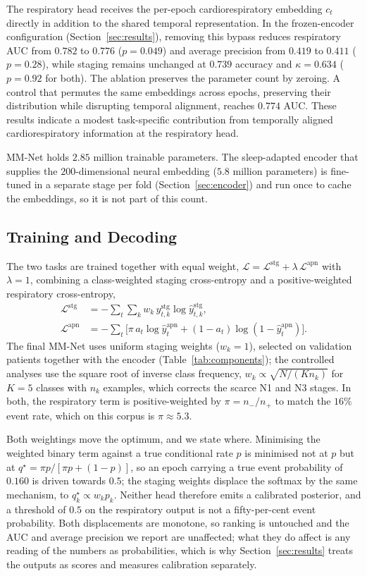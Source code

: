 \documentclass{ieeeaccess}
\newcommand{\fzAuc}{0.782}
\newcommand{\fzAp}{0.419}
\begin{document}
The respiratory head receives the per-epoch cardiorespiratory embedding $c_t$
directly in addition to the shared temporal representation. In the frozen-encoder
configuration (Section~\ref{sec:results}), removing this bypass
reduces respiratory AUC from $\fzAuc$ to $0.776$ ($p=0.049$) and average
precision from $\fzAp$ to $0.411$ ($p=0.28$), while staging remains unchanged
at $0.739$ accuracy and $\kappa=0.634$ ($p=0.92$ for both). The ablation
preserves the parameter count by zeroing. A control that permutes the same embeddings across
epochs, preserving their distribution while disrupting temporal alignment,
reaches $0.774$ AUC. These results indicate a modest task-specific contribution
from temporally aligned cardiorespiratory information at the respiratory head.


MM-Net holds $2.85$ million trainable parameters. The sleep-adapted encoder that supplies
the $200$-dimensional neural embedding ($5.8$ million parameters) is fine-tuned in a separate
stage per fold (Section~\ref{sec:encoder}) and run once to cache the embeddings, so it is not
part of this count.

\subsection{Training and Decoding}
\label{sec:training}
The two tasks are trained together with equal weight, $\mathcal{L}=\mathcal{L}^{\mathrm{stg}}+\lambda\,\mathcal{L}^{\mathrm{apn}}$ with $\lambda=1$, combining a class-weighted staging cross-entropy and a positive-weighted respiratory cross-entropy,
\begin{align}
\mathcal{L}^{\mathrm{stg}}&=-\sum_t\sum_{k}w_k\,y^{\mathrm{stg}}_{t,k}\log\hat y^{\mathrm{stg}}_{t,k},\\
\mathcal{L}^{\mathrm{apn}}&=-\sum_t\big[\pi\,a_t\log\hat y^{\mathrm{apn}}_t+(1-a_t)\log(1-\hat y^{\mathrm{apn}}_t)\big].
\end{align}
The final MM-Net uses uniform staging weights ($w_k=1$), selected on validation patients
together with the encoder (Table~\ref{tab:components}); the controlled analyses use the
square root of inverse class frequency,
$w_k\propto\sqrt{N/(K n_k)}$ for $K=5$ classes with $n_k$ examples, which corrects the scarce
N1 and N3 stages. In both, the respiratory term is
positive-weighted by $\pi=n_-/n_+$ to match the $16\%$ event rate, which on this corpus is
$\pi\approx5.3$.

Both weightings move the optimum, and we state where. Minimising the weighted binary term
against a true conditional rate $p$ is minimised not at $p$ but at
$q^{\star}=\pi p/[\pi p+(1-p)]$, so an epoch carrying a true event probability of $0.160$ is
driven towards $0.5$; the staging weights displace the softmax by the same mechanism, to
$q^{\star}_k\propto w_k p_k$. Neither head therefore emits a calibrated posterior, and a
threshold of $0.5$ on the respiratory output is not a fifty-per-cent event probability. Both
displacements are monotone, so ranking is untouched and the AUC and average precision we
report are unaffected; what they do affect is any reading of the numbers as probabilities,
which is why Section~\ref{sec:results} treats the outputs as scores and measures calibration
separately.
\end{document}

